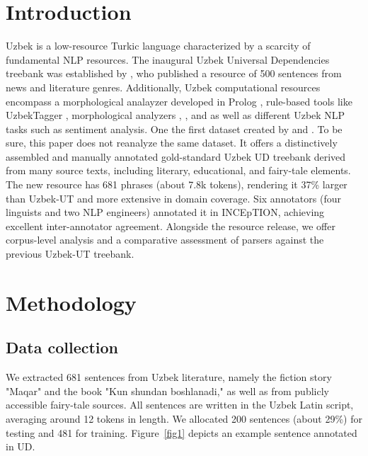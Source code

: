 \documentclass[10pt,conference,a4paper]{IEEEtran_EDM}
\begin{document}
\section{Introduction}
Uzbek is a low-resource Turkic language characterized by a scarcity of fundamental NLP resources. The inaugural Uzbek Universal Dependencies treebank was established by \cite{Akhundjanova-Talamo}, who published a resource of 500 sentences from news and literature genres. Additionally, Uzbek computational resources encompass a morphological analayzer\cite{11207015} developed in Prolog \cite{Matlatipov2009}, rule-based tools like UzbekTagger \cite{sharipov-et-all},  morphological analyzers \cite{ulugbek-morph}, \cite{nilufar-abdurakhmon}, \cite{11289399} and \cite{10.1007/978-3-030-63119-2_59} as well as different Uzbek NLP tasks such as  sentiment analysis\cite{matlatipov-etal-2024-uzabsa}. One the first dataset created by \cite{Akhundjanova-Talamo} and \cite{9670319}. To be sure, this paper does not reanalyze the same dataset. It offers a distinctively assembled and manually annotated gold-standard Uzbek UD treebank derived from many source texts, including literary, educational, and fairy-tale elements. The new resource has 681 phrases (about 7.8k tokens), rendering it 37\% larger than Uzbek-UT and more extensive in domain coverage. Six annotators (four linguists and two NLP engineers) annotated it in INCEpTION\cite{klie-etal-2018-inception}, achieving excellent inter-annotator agreement. Alongside the resource release, we offer corpus-level analysis and a comparative assessment of parsers against the previous Uzbek-UT treebank.

\section{Methodology}
\subsection{Data collection} We extracted 681 sentences from Uzbek literature, namely the fiction story "Maqar" and the book "Kun shundan boshlanadi," as well as from publicly accessible fairy-tale sources. All sentences are written in the Uzbek Latin script, averaging around 12 tokens in length. We allocated 200 sentences (about 29\%) for testing and 481 for training. Figure~\ref{fig1} depicts an example sentence annotated in UD.
\end{document}
